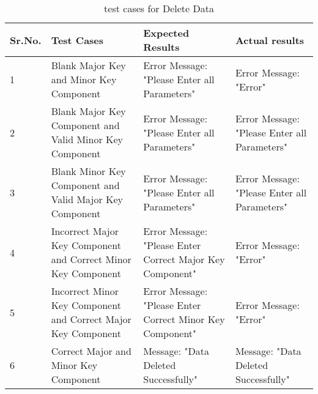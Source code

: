 \begin{table}[h]
\begin{flushleft}
\caption{test cases for Delete Data}\label{test cases for Delete Data}
\begin{tabular}{|p{1cm}|p{4cm}|p{4cm}|p{5cm}|} \hline
Sr.No. & Test Cases & Expected Results & Actual results \\ \hline
1 & Blank Major Key and Minor Key Component & Error Message: "Please Enter all Parameters" & Error Message: "Error"\\	 \hline
2 & Blank Major Key Component and Valid Minor Key Component & Error Message: "Please Enter all Parameters" & Error Message: "Please Enter all Parameters"\\	 \hline
3 & Blank Minor Key Component and Valid Major Key Component & Error Message: "Please Enter all Parameters" & Error Message: "Please Enter all Parameters"\\	 \hline
4 & Incorrect Major Key Component and Correct Minor Key Component & Error Message: "Please Enter Correct Major Key Component" & Error Message: "Error"\\	 \hline
5 & Incorrect Minor Key Component and Correct Major Key Component & Error Message: "Please Enter Correct Minor Key Component" & Error Message: "Error"\\	 \hline
6 & Correct Major and Minor Key Component & Message: "Data Deleted Successfully" & Message: "Data Deleted Successfully"\\	 \hline
\end{tabular}
\end{flushleft}
\end{table}

